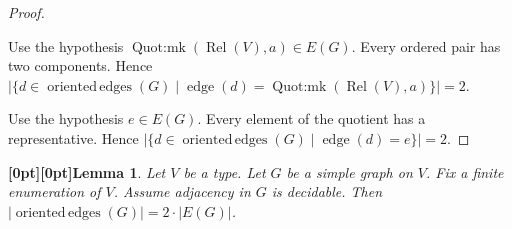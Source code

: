 \documentclass{article}
\makeatletter
\newcommand{\paperanchor}[1]{\hypertarget{#1}{}}%
\def\paperdest{\pdfextension dest}\def\paperstart{\pdfextension startlink}%
\def\paperend{\pdfextension endlink}\def\papercolor{\pdfextension colorstack}%
\let\paperdest\pdfdest\let\paperstart\pdfstartlink\let\paperend\pdfendlink\let\papercolor\pdfcolorstack
\newcommand{\paperanchor}[1]{\paperdest name{#1} xyz}%
\newcommand{\paperanchor}[1]{\special{pdf:dest (#1) [@thispage /XYZ null @ypos null]}}%
\newcommand{\paperlineanchor}[1]{\raisebox{10pt}[0pt][0pt]{\paperanchor{#1}}}
\DeclareRobustCommand{\paperresultname}[1]{\paperlineanchor{theorem:\arabic{theorem}}#1}
\theoremstyle{paperresult}
\newtheorem{lemma}[theorem]{\paperresultname{Lemma}}
\newenvironment{proofstep}{\par\smallskip\ifdim\leftskip<3em\relax\advance\leftskip by 1em\relax\fi\noindent\ignorespaces}{\par\smallskip}
\makeatother
\begin{document}
\begin{proof}
\begin{proofstep}
\begin{proofstep}
\end{proofstep}
Use the hypothesis \(\operatorname{Quot\mathord{:}mk}\left(\operatorname{Rel}\left(V\right), a\right) \in E(G)\).
Every ordered pair has two components. Hence \(|\{d\in \operatorname{oriented\,edges}(G) \mid \operatorname{edge}(d) = \operatorname{Quot\mathord{:}mk}(\operatorname{Rel}(V),\allowbreak{} a)\}| = 2\).
\end{proofstep}
Use the hypothesis \(e \in E(G)\).
Every element of the quotient has a representative. Hence \(\left|\{d\in \operatorname{oriented\,edges}(G) \mid \operatorname{edge}\left(d\right) = e\}\right| = 2\).
\end{proof}

\begin{lemma}\label{theorem:6}
Let \(V\) be a type. Let \(G\) be a simple graph on \(V\). Fix a finite enumeration of \(V\). Assume adjacency in \(G\) is decidable. Then \(\left|\operatorname{oriented\,edges}(G)\right| = 2 \cdot \left|E(G)\right|\).
\end{lemma}
\end{document}

